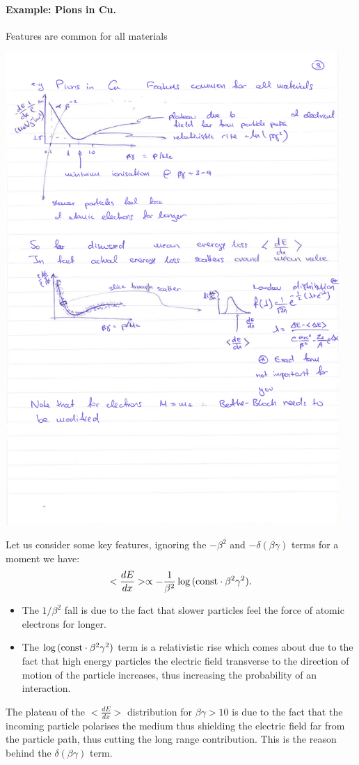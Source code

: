 \paragraph{Example: Pions in Cu.} Features are common for all materials

\begin{center}
\includegraphics[width=0.95\textwidth]{fig/strongforce/matterinteractions/interactions4.pdf}
\end{center}

Let us consider some key features, ignoring the $-\beta^2$ and $-\delta(\beta\gamma)$ terms for a moment we have:
\[<\frac{dE}{dx}>\propto -\frac{1}{\beta^2}\log{({\rm const}\cdot\beta^2\gamma^2)}.\]
\begin{itemize}
\item The $1/\beta^2$ fall is due to the fact that slower particles feel the force of atomic electrons for longer. 
\item The $\log{({\rm const}}\cdot\beta^2\gamma^2)$ term is a relativistic rise which comes about due to the fact that high energy particles the electric field transverse to the direction of motion of the particle increases, thus increasing the probability of an interaction.
\end{itemize}
The plateau of the $<\frac{dE}{dx}>$ distribution for $\beta\gamma>10$ is due to the fact that the incoming particle polarises the medium thus shielding the electric field far from the particle path, thus cutting the long range contribution. This is the reason behind the $\delta(\beta\gamma)$ term.  

